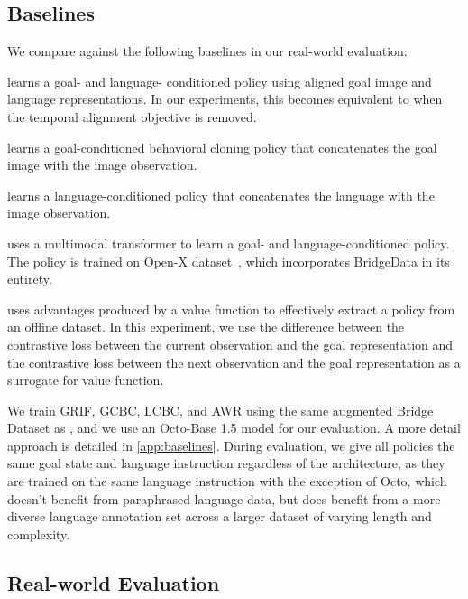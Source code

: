 \subsection{Baselines}\label{sec:baselines}
\label{sec:realworld_baselines}
We compare against the following baselines in our real-world evaluation:
\begin{description}[itemsep=0pt,topsep=0pt]
    \item[GRIF~\citep{myers2023goal}] learns a goal- and language- conditioned policy using aligned goal image and language representations. In our experiments, this becomes equivalent to \Method{} when the temporal alignment objective is removed.
    \item[GCBC~\citep{walke2023bridgedata}] learns a goal-conditioned behavioral cloning policy that concatenates the goal image with the image observation.
    \item[LCBC~\citep{walke2023bridgedata}] learns a language-conditioned policy that concatenates the language with the image observation.
    \item[OCTO~\citep{ghosh2024octo}] uses a multimodal transformer to learn a goal- and language-conditioned policy. The policy is trained on Open-X dataset~\citep{oneill2024open}, which incorporates BridgeData in its entirety.
    \item[AWR~\citep{peng2019advantage}] uses advantages produced by a value function to effectively extract a policy from an offline dataset. In this experiment, we use the difference between the contrastive loss between the current observation and the goal representation and the contrastive loss between the next observation and the goal representation as a surrogate for value function.
\end{description}

We train GRIF, GCBC, LCBC, and AWR using the same augmented Bridge Dataset as \Method{}, and we use an Octo-Base 1.5 model for our evaluation.
A more detail approach is detailed in \cref{app:baselines}.
During evaluation, we give all policies the same goal state and language instruction regardless of the architecture, as they are trained on the same language instruction with the exception of Octo, which doesn't benefit from paraphrased language data, but does benefit from a more diverse language annotation set across a larger dataset of varying length and complexity.

\subsection{Real-world Evaluation}
\label{sec:realworld}

